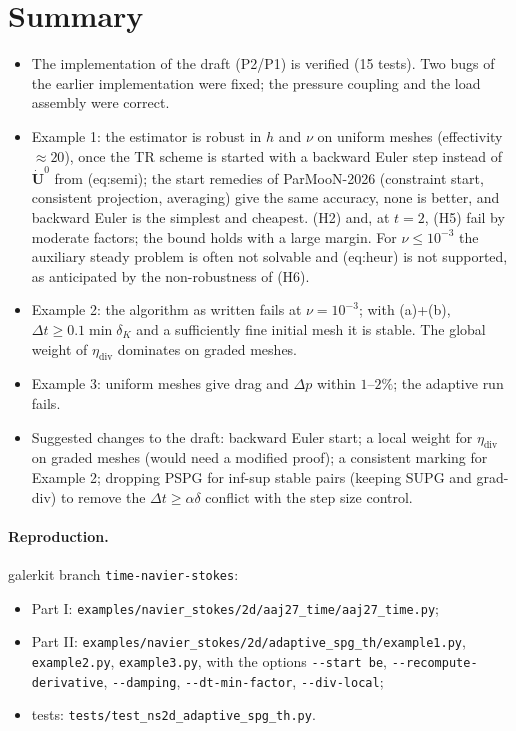 \documentclass[11pt,a4paper]{article}
\newcommand{\bud}{\dot{\boldsymbol{U}}}
\newcommand{\dt}{\Delta t}
\newcommand{\code}[1]{\texttt{#1}}
\begin{document}
\section{Summary}
\begin{itemize}
\item The implementation of the draft (P2/P1) is verified (15 tests). Two bugs of the earlier implementation were fixed; the
pressure coupling and the load assembly were correct.
\item Example 1: the estimator is robust in $h$ and $\nu$ on uniform meshes (effectivity $\approx20$), once the TR scheme is
started with a backward Euler step instead of $\bud^0$ from (eq:semi); the start remedies of ParMooN-2026 (constraint start,
consistent projection, averaging) give the same accuracy, none is better, and backward Euler is the simplest and cheapest. (H2) and, at $t=2$, (H5) fail by moderate factors; the
bound holds with a large margin. For $\nu\le10^{-3}$ the auxiliary steady problem is often not solvable and (eq:heur) is not
supported, as anticipated by the non-robustness of (H6).
\item Example 2: the algorithm as written fails at $\nu=10^{-3}$; with (a)+(b), $\dt\ge0.1\min\delta_K$ and a sufficiently
fine initial mesh it is stable. The global weight of $\eta_{\mathrm{div}}$ dominates on graded meshes.
\item Example 3: uniform meshes give drag and $\Delta p$ within $1$--$2\%$; the adaptive run fails.
\item Suggested changes to the draft: backward Euler start; a local weight for $\eta_{\mathrm{div}}$ on graded meshes (would need
a modified proof); a consistent marking for Example 2; dropping PSPG for inf-sup stable pairs (keeping SUPG and grad-div) to
remove the $\dt\ge\alpha\delta$ conflict with the step size control.
\end{itemize}

\paragraph{Reproduction.} galerkit branch \code{time-navier-stokes}:
\begin{itemize}
\item Part I: \code{examples/\allowbreak navier\_stokes/\allowbreak 2d/\allowbreak aaj27\_time/\allowbreak aaj27\_time.py};
\item Part II: \code{examples/\allowbreak navier\_stokes/\allowbreak 2d/\allowbreak adaptive\_spg\_th/\allowbreak example1.py},
\code{example2.py}, \code{example3.py}, with the options \code{-{}-start be}, \code{-{}-recompute-derivative},
\code{-{}-damping}, \code{-{}-dt-min-factor}, \code{-{}-div-local};
\item tests: \code{tests/\allowbreak test\_ns2d\_adaptive\_spg\_th.py}.
\end{itemize}
\end{document}
